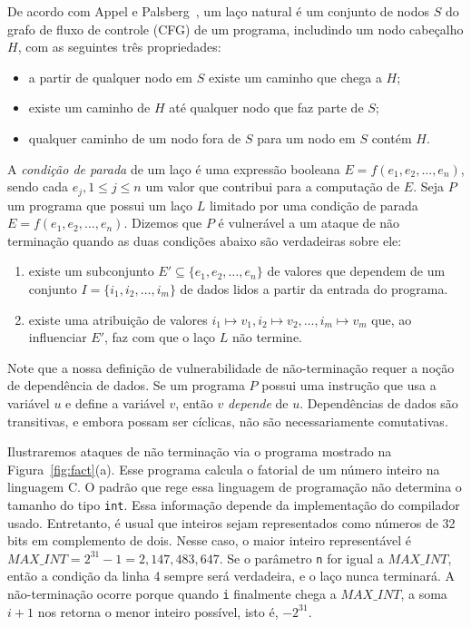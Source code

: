 \documentclass{llncs}
\begin{document}
De acordo com Appel e Palsberg~\cite[p.376]{Appel02}, um laço natural é um
conjunto de nodos $S$ do grafo de fluxo de controle (CFG) de um programa,
includindo um nodo cabeçalho $H$, com as seguintes três propriedades:
%
\begin{itemize}
\item a partir de qualquer nodo em $S$ existe um caminho que chega a $H$;
\item existe um caminho de $H$ até qualquer nodo que faz parte de $S$;
\item qualquer caminho de um nodo fora de $S$ para um nodo em $S$
contém $H$.
\end{itemize}
%
A {\em condição de parada} de um laço é uma expressão booleana
$E = f(e_1, e_2, \ldots, e_n)$, sendo cada $e_j, 1 \leq j \leq n$ um valor que
contribui para a computação de $E$.
Seja $P$ um programa que possui um laço $L$ limitado por uma condição
de parada $E = f(e_1, e_2, \ldots, e_n)$.
Dizemos que $P$ é vulnerável a um ataque de não
terminação quando as duas condições abaixo são verdadeiras sobre ele:
\begin{enumerate}
\item existe um subconjunto $E' \subseteq \{e_1, e_2, \ldots, e_n\}$ de
valores que dependem de um conjunto $I = \{i_1, i_2, \ldots, i_m\}$ de
dados lidos a partir da entrada do programa.
\item existe uma atribuição de valores $i_1 \mapsto v_1,
i_2 \mapsto v_2, \ldots, i_m \mapsto v_m$ que, ao influenciar $E'$, faz com
que o laço $L$ não termine.
\end{enumerate}
Note que a nossa definição de vulnerabilidade de não-terminação requer a
noção de dependência de dados.
Se um programa $P$ possui uma instrução que usa a variável $u$ e define a
variável $v$, então $v$ {\em depende} de $u$.
Dependências de dados são transitivas, e embora possam ser cíclicas, não
são necessariamente comutativas.

Ilustraremos ataques de não terminação via o programa mostrado na
Figura~\ref{fig:fact}(a).
Esse programa calcula o fatorial de um número inteiro na linguagem C.
O padrão que rege essa linguagem de programação não determina o tamanho do
tipo \texttt{int}.
Essa informação depende da implementação do compilador usado.
Entretanto, é usual que inteiros sejam representados como números de 32
bits em complemento de dois. 
Nesse caso, o maior inteiro representável é
$\mathit{MAX\_INT} = 2^{31} - 1 = 2,147,483,647$.
Se o parâmetro \texttt{n} for igual a $\mathit{MAX\_INT}$, então a condição
da linha 4 sempre será verdadeira, e o laço nunca terminará.
A não-terminação ocorre porque quando \texttt{i} finalmente chega a
$\mathit{MAX\_INT}$, a soma $i + 1$ nos retorna o menor inteiro possível, isto
é, $- 2^{31}$.
\end{document}
